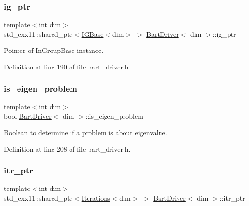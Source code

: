 \subsubsection{\texorpdfstring{ig\+\_\+ptr}{ig\_ptr}}
{\footnotesize\ttfamily template$<$int dim$>$ \\
std\+\_\+cxx11\+::shared\+\_\+ptr$<$\hyperlink{class_i_g_base}{I\+G\+Base}$<$dim$>$ $>$ \hyperlink{class_bart_driver}{Bart\+Driver}$<$ dim $>$\+::ig\+\_\+ptr\hspace{0.3cm}{\ttfamily [private]}}



Pointer of In\+Group\+Base instance. 



Definition at line 190 of file bart\+\_\+driver.\+h.

\mbox{\label{class_bart_driver_a6ee26434a788284182df94da5d71ca12}} 
\subsubsection{\texorpdfstring{is\+\_\+eigen\+\_\+problem}{is\_eigen\_problem}}
{\footnotesize\ttfamily template$<$int dim$>$ \\
bool \hyperlink{class_bart_driver}{Bart\+Driver}$<$ dim $>$\+::is\+\_\+eigen\+\_\+problem\hspace{0.3cm}{\ttfamily [private]}}



Boolean to determine if a problem is about eigenvalue. 



Definition at line 208 of file bart\+\_\+driver.\+h.

\mbox{\label{class_bart_driver_ae07e7a592dd255d69685f17d98a2ecc6}} 
\subsubsection{\texorpdfstring{itr\+\_\+ptr}{itr\_ptr}}
{\footnotesize\ttfamily template$<$int dim$>$ \\
std\+\_\+cxx11\+::shared\+\_\+ptr$<$\hyperlink{class_iterations}{Iterations}$<$dim$>$ $>$ \hyperlink{class_bart_driver}{Bart\+Driver}$<$ dim $>$\+::itr\+\_\+ptr\hspace{0.3cm}{\ttfamily [private]}}



